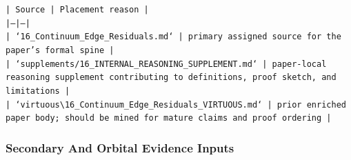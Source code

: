 \documentclass[11pt]{article}
\begin{document}
\noindent\texttt{| Source | Placement reason |}\\
\noindent\texttt{|---|---|}\\
\noindent\texttt{| `16\_Continuum\_Edge\_Residuals.md` | primary assigned source for the paper's formal spine |}\\
\noindent\texttt{| `supplements/16\_INTERNAL\_REASONING\_SUPPLEMENT.md` | paper-local reasoning supplement contributing to definitions, proof sketch, and limitations |}\\
\noindent\texttt{| `virtuous\textbackslash{}16\_Continuum\_Edge\_Residuals\_VIRTUOUS.md` | prior enriched paper body; should be mined for mature claims and proof ordering |}\\

\subsubsection*{Secondary And Orbital Evidence Inputs}
\end{document}
